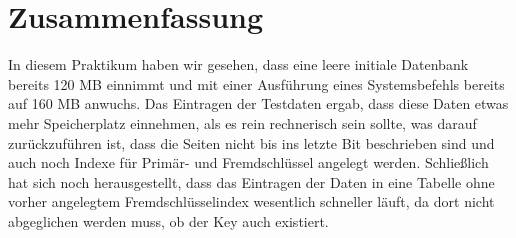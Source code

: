 \chapter{Zusammenfassung}
In diesem Praktikum haben wir gesehen, dass eine leere initiale Datenbank bereits 120 MB einnimmt und mit einer Ausführung eines Systemsbefehls bereits auf 160 MB anwuchs. Das Eintragen der Testdaten ergab, dass diese Daten etwas mehr Speicherplatz einnehmen, als es rein rechnerisch sein sollte, was darauf zurückzuführen ist, dass die Seiten nicht bis ins letzte Bit beschrieben sind und auch noch Indexe für Primär- und Fremdschlüssel angelegt werden. Schließlich hat sich noch herausgestellt, dass das Eintragen der Daten in eine Tabelle ohne vorher angelegtem Fremdschlüsselindex wesentlich schneller läuft, da dort nicht abgeglichen werden muss, ob der Key auch existiert.